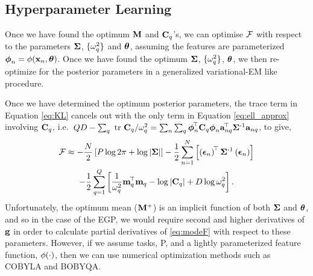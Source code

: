 \subsection{Hyperparameter Learning}
Once we have found the optimum $\mathbf{M}$ and $\mathbf{C}_q$'s, we can optimise
$\mathcal{F}$ with respect to the parameters $\mathbf{\Sigma}$, $\{ \omega^2_q \}$ and $\boldsymbol\theta$, assuming the
features are parameterized $\boldsymbol\phi_n = \phi\!\left({{\mathbf{x}_n, \boldsymbol\theta}}\right)$. Once we
have found the optimum $\mathbf{\Sigma}$, $\{ \omega^2_q \}$, $\boldsymbol\theta$, we then re-optimize for the
posterior parameters  in a generalized  variational-EM like procedure.

Once we have determined the optimum posterior parameters, the trace term in
Equation \eqref{eq:KL} cancels out with the only term in Equation \eqref{eq:ell_approx} 
involving $\mathbf{C}_q$, i.e.\ $QD -
\sum_q\mbox{ \rm tr }{\ensuremath{\mathbf{C}}_q}/\omega^2_q = 
\sum_n \sum_q \boldsymbol\phi_n^{\!\top}\mathbf{C}_q  \boldsymbol\phi_n\mathbf{a}_{nq}^{\!\top}\mathbf{\Sigma}^{\text{-}1} \mathbf{a}_{nq}$,
to give,
\begin{multline}
    \mathcal{F} \approx 
        - \frac{N}{2}\left[{P\log{2\pi} + \log\left|{\mathbf{\Sigma}}\right|}\right]
    - \frac{1}{2} \sum^N_{n=1} \left[{
        \left({\boldsymbol{ \epsilon }_n}\right)^{\!\top}
        \mathbf{\Sigma}^{\text{-}1}
        \left({\boldsymbol{ \epsilon }_n}\right)}\right] \\
        -\frac{1}{2} \sum^{Q}_{q=1} \left[{
        \frac{1}{\omega^2_q} \mathbf{m}_q^{\!\top}\mathbf{m}_q
        - \log\left|{\mathbf{C}_q}\right| + D \log \omega^2_q}\right].
    \label{eq:modeF}
\end{multline}
Unfortunately, the optimum mean ($\mathbf{M}^{+}$) is an implicit function of both $\mathbf{\Sigma}$ and
$\boldsymbol\theta$, and so in the case of the EGP, we would require second and higher
derivatives of $\mathbf{g}$ in order to calculate partial derivatives of
\eqref{eq:modeF} with respect to these parameters. 
    However, if we assume  tasks, P, and a lightly
parameterized feature function, $\phi\!\left({{\cdot}}\right)$, then we can use numerical 
optimization methods such as COBYLA and BOBYQA. 



 
